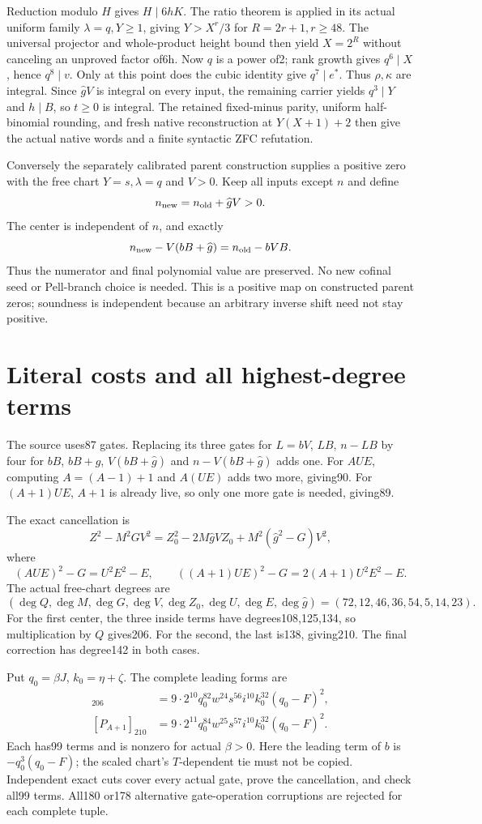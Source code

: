 Reduction modulo $H$ gives $H\mid6hK$. The ratio theorem is applied in
its actual uniform family $\lambda=q,Y\ge1$, giving $Y>X^r/3$ for
$R=2r+1,r\ge48$. The universal projector and whole-product height bound
then yield $X=2^R$ without canceling an unproved factor of6h. Now $q$ is
a power of2; rank growth gives $q^6\mid X$, hence $q^8\mid v$. Only at
this point does the cubic identity give $q^7\mid e^*$.
Thus $\rho,\kappa$ are integral. Since $\widehat gV$ is integral on every
input, the remaining carrier yields $q^3\mid Y$ and $h\mid B$, so $t\ge0$
is integral. The retained fixed-minus parity, uniform half-binomial
rounding, and fresh native reconstruction at $Y(X+1)+2$ then give the
actual native words and a finite syntactic ZFC refutation.

Conversely the separately calibrated parent construction supplies a
positive zero with the free chart $Y=s,\lambda=q$ and $V>0$. Keep all
inputs except $n$ and define
\[
 n_{\rm new}=n_{\rm old}+\widehat gV>0.
\]
The center is independent of $n$, and exactly
\[
 n_{\rm new}-V(bB+\widehat g)=n_{\rm old}-bVB.
\]
Thus the numerator and final polynomial value are preserved. No new
cofinal seed or Pell-branch choice is needed. This is a positive map on
constructed parent zeros; soundness is independent because an arbitrary
inverse shift need not stay positive.

\section{Literal costs and all highest-degree terms}
The source uses87 gates. Replacing its three gates for $L=bV$, $LB$,
$n-LB$ by four for $bB$, $bB+\widehat g$, $V(bB+\widehat g)$ and
$n-V(bB+\widehat g)$ adds one. For $AUE$, computing $A=(A-1)+1$
and $A(UE)$ adds two more, giving90. For $(A+1)UE$, $A+1$ is already
live, so only one more gate is needed, giving89.

The exact cancellation is
\[
 Z^2-M^2GV^2=Z_0^2-2M\widehat gVZ_0+M^2(\widehat g^2-G)V^2,
\]
where
\[
 (AUE)^2-G=U^2E^2-E,\qquad
 ((A+1)UE)^2-G=2(A+1)U^2E^2-E.
\]
The actual free-chart degrees are
\[
 (\deg Q,\deg M,\deg G,\deg V,\deg Z_0,\deg U,\deg E,
 \deg\widehat g)=(72,12,46,36,54,5,14,23).
\]
For the first center, the three inside terms have degrees108,125,134,
so multiplication by $Q$ gives206. For the second, the last is138,
giving210. The final correction has degree142 in both cases.

Put $q_0=\beta J$, $k_0=\eta+\zeta$. The complete leading forms are
\begin{align*}
 [P_A]_{206}&=9\cdot2^{10}q_0^{82}w^{24}s^{56}i^{10}k_0^{32}(q_0-F)^2,\\
 [P_{A+1}]_{210}&=9\cdot2^{11}q_0^{84}w^{25}s^{57}i^{10}k_0^{32}(q_0-F)^2.
\end{align*}
Each has99 terms and is nonzero for actual $\beta>0$. Here the leading
term of $b$ is $-q_0^3(q_0-F)$; the scaled chart's $T$-dependent tie
must not be copied. Independent exact cuts cover every actual gate,
prove the cancellation, and check all99 terms. All180 or178 alternative
gate-operation corruptions are rejected for each complete tuple.

